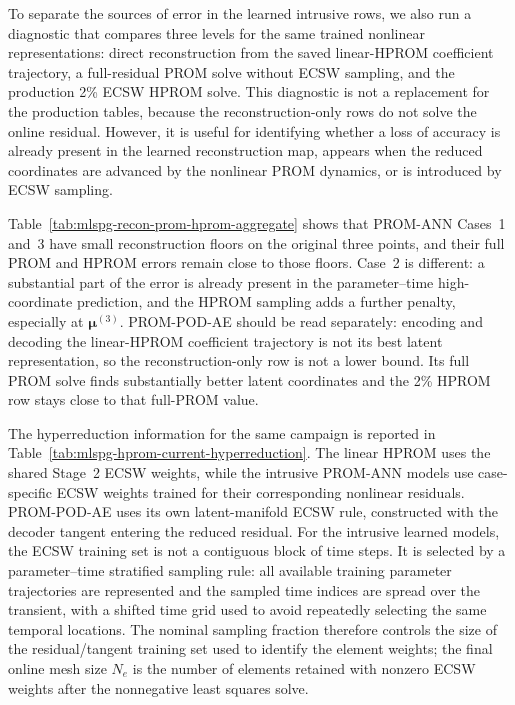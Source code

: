 \documentclass[11pt]{article}
\begin{document}
To separate the sources of error in the learned intrusive rows, we also run a
diagnostic that compares three levels for the same trained nonlinear
representations: direct reconstruction from the saved linear-HPROM coefficient
trajectory, a full-residual PROM solve without ECSW sampling, and the production
2\% ECSW HPROM solve.  This diagnostic is not a replacement for the production
tables, because the reconstruction-only rows do not solve the online residual.
However, it is useful for identifying whether a loss of accuracy is already
present in the learned reconstruction map, appears when the reduced coordinates
are advanced by the nonlinear PROM dynamics, or is introduced by ECSW sampling.



Table~\ref{tab:mlspg-recon-prom-hprom-aggregate} shows that PROM-ANN
Cases~1 and~3 have small reconstruction floors on the original three points,
and their full PROM and HPROM errors remain close to those floors.  Case~2 is
different: a substantial part of the error is already present in the
parameter--time high-coordinate prediction, and the HPROM sampling adds a
further penalty, especially at $\bm\mu^{(3)}$.  PROM-POD-AE should be read
separately: encoding and decoding the linear-HPROM coefficient trajectory is
not its best latent representation, so the reconstruction-only row is not a
lower bound.  Its full PROM solve finds substantially better latent coordinates
and the 2\% HPROM row stays close to that full-PROM value.

The hyperreduction information for the same campaign is reported in
Table~\ref{tab:mlspg-hprom-current-hyperreduction}.  The linear HPROM uses the
shared Stage~2 ECSW weights, while the intrusive PROM-ANN models use
case-specific ECSW weights trained for their corresponding nonlinear residuals.
PROM-POD-AE uses its own latent-manifold ECSW rule, constructed with the
decoder tangent entering the reduced residual.  For the intrusive learned
models, the ECSW training set is not a contiguous block of time steps.  It is
selected by a parameter--time stratified sampling rule:
all available training parameter trajectories are represented and the sampled
time indices are spread over the transient, with a shifted time grid used to
avoid repeatedly selecting the same temporal locations.  The nominal sampling
fraction therefore controls the size of the residual/tangent training set used
to identify the element weights; the final online mesh size $N_e$ is the number
of elements retained with nonzero ECSW weights after the nonnegative least
squares solve.
\end{document}
